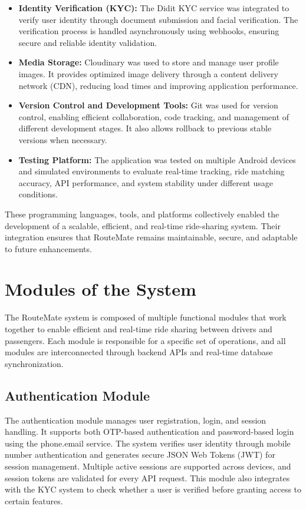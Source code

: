 \documentclass[10pt,a4paper]{report}
\begin{document}
\begin{itemize}
\item \textbf{Identity Verification (KYC):}
The Didit KYC service was integrated to verify user identity through document submission and facial verification. The verification process is handled asynchronously using webhooks, ensuring secure and reliable identity validation.

\item \textbf{Media Storage:}
Cloudinary was used to store and manage user profile images. It provides optimized image delivery through a content delivery network (CDN), reducing load times and improving application performance.

\item \textbf{Version Control and Development Tools:}
Git was used for version control, enabling efficient collaboration, code tracking, and management of different development stages. It also allows rollback to previous stable versions when necessary.

\item \textbf{Testing Platform:}
The application was tested on multiple Android devices and simulated environments to evaluate real-time tracking, ride matching accuracy, API performance, and system stability under different usage conditions.

\end{itemize}

\justify\large These programming languages, tools, and platforms collectively enabled the development of a scalable, efficient, and real-time ride-sharing system. Their integration ensures that RouteMate remains maintainable, secure, and adaptable to future enhancements.

\section{Modules of the System}

\justify\large The RouteMate system is composed of multiple functional modules that work together to enable efficient and real-time ride sharing between drivers and passengers. Each module is responsible for a specific set of operations, and all modules are interconnected through backend APIs and real-time database synchronization.

\subsection{Authentication Module}

\justify\large The authentication module manages user registration, login, and session handling. It supports both OTP-based authentication and password-based login using the phone.email service. The system verifies user identity through mobile number authentication and generates secure JSON Web Tokens (JWT) for session management. Multiple active sessions are supported across devices, and session tokens are validated for every API request. This module also integrates with the KYC system to check whether a user is verified before granting access to certain features.
\end{document}
